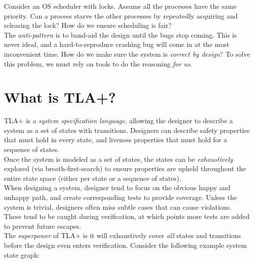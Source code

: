 Consider an OS scheduler with locks. Assume all the processes have the same
priority. Can a process starve the other processes by repeatedly acquiring and
releasing the lock? How do we ensure scheduling is fair?\\

The \textit{anti-pattern} is to band-aid the design until the bugs stop coming.
This is never ideal, and a hard-to-reproduce crashing bug will come in at the
most inconvenient time. How do we make sure the system is \textit{correct by
design}? To solve this problem, we must rely on tools to do the reasoning
\textit{for us}.

\section{What is TLA+?}

TLA+ is a \textit{system specification language}, allowing the designer to
describe a system as a set of states with transitions. Designers can describe
safety properties that must hold in every state, and liveness properties that
must hold for a sequence of states.\\

Once the system is modeled as a set of states, the states can be
\textit{exhaustively} explored (via breath-first-search) to ensure properties
are upheld throughout the entire state space (either per state or a sequence of
states).\\

When designing a system, designer tend to focus on the obvious happy and unhappy
path, and create corresponding tests to provide coverage. Unless the system is
trivial, designers often miss subtle cases that can cause violations. These tend
to be caught during verification, at which points more tests are added to
prevent future escapes.\\

The \textit{superpower} of TLA+ is it will exhaustively cover \textit{all}
states and transitions before the design even enters verification. Consider the
following example system state graph: 

